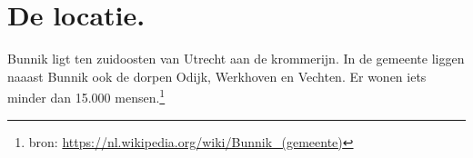 \section{De locatie.}
Bunnik ligt ten zuidoosten van Utrecht aan de krommerijn. 
In de gemeente liggen naaast Bunnik ook de dorpen Odijk, Werkhoven en Vechten. 
Er wonen iets minder dan 15.000 mensen.\footnote{bron: \url{https://nl.wikipedia.org/wiki/Bunnik_(gemeente)}}

